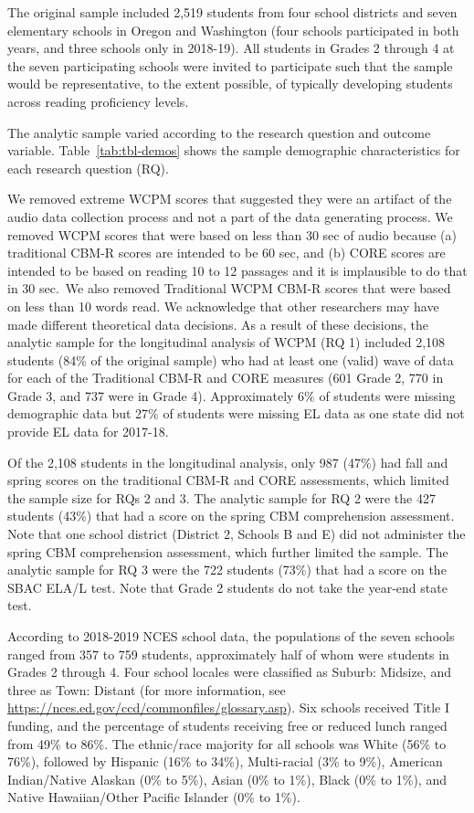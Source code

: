 \documentclass[
  english,
  man, fleqn, noextraspace]{apa6}
\begin{document}
The original sample included 2,519 students from four school districts and seven elementary schools in Oregon and Washington (four schools participated in both years, and three schools only in 2018-19). All students in Grades 2 through 4 at the seven participating schools were invited to participate such that the sample would be representative, to the extent possible, of typically developing students across reading proficiency levels.

The analytic sample varied according to the research question and outcome variable. Table~\ref{tab:tbl-demos} shows the sample demographic characteristics for each research question (RQ).

We removed extreme WCPM scores that suggested they were an artifact of the audio data collection process and not a part of the data generating process. We removed WCPM scores that were based on less than 30 sec of audio because (a) traditional CBM-R scores are intended to be 60 sec, and (b) CORE scores are intended to be based on reading 10 to 12 passages and it is implausible to do that in 30 sec.~We also removed Traditional WCPM CBM-R scores that were based on less than 10 words read. We acknowledge that other researchers may have made different theoretical data decisions. As a result of these decisions, the analytic sample for the longitudinal analysis of WCPM (RQ 1) included 2,108 students (84\% of the original sample) who had at least one (valid) wave of data for each of the Traditional CBM-R and CORE measures (601 Grade 2, 770 in Grade 3, and 737 were in Grade 4). Approximately 6\% of students were missing demographic data but 27\% of students were missing EL data as one state did not provide EL data for 2017-18.

Of the 2,108 students in the longitudinal analysis, only 987 (47\%) had fall and spring scores on the traditional CBM-R and CORE assessments, which limited the sample size for RQs 2 and 3. The analytic sample for RQ 2 were the 427 students (43\%) that had a score on the spring CBM comprehension assessment. Note that one school district (District 2, Schools B and E) did not administer the spring CBM comprehension assessment, which further limited the sample. The analytic sample for RQ 3 were the 722 students (73\%) that had a score on the SBAC ELA/L test. Note that Grade 2 students do not take the year-end state test.

According to 2018-2019 NCES school data, the populations of the seven schools ranged from 357 to 759 students, approximately half of whom were students in Grades 2 through 4. Four school locales were classified as Suburb: Midsize, and three as Town: Distant (for more information, see \url{https://nces.ed.gov/ccd/commonfiles/glossary.asp}). Six schools received Title I funding, and the percentage of students receiving free or reduced lunch ranged from 49\% to 86\%. The ethnic/race majority for all schools was White (56\% to 76\%), followed by Hispanic (16\% to 34\%), Multi-racial (3\% to 9\%), American Indian/Native Alaskan (0\% to 5\%), Asian (0\% to 1\%), Black (0\% to 1\%), and Native Hawaiian/Other Pacific Islander (0\% to 1\%).
\end{document}
